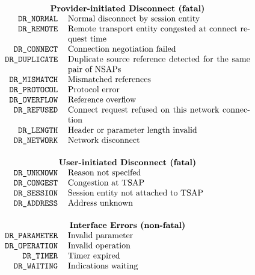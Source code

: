 
\normalsize
\[\begin{tabular}{rp{3.0in}}
	\multicolumn{2}{c}{\bf Provider-initiated Disconnect (fatal)}\\
\tt DR\_NORMAL&		Normal disconnect by session entity\\
\tt DR\_REMOTE&		Remote transport entity congested at connect request
			time\\
\tt DR\_CONNECT&	Connection negotiation failed\\
\tt DR\_DUPLICATE&	Duplicate source reference detected for the same pair
			of NSAPs\\
\tt DR\_MISMATCH&	Mismatched references\\
\tt DR\_PROTOCOL&	Protocol error\\
\tt DR\_OVERFLOW&	Reference overflow\\
\tt DR\_REFUSED&	Connect request refused on this network connection\\
\tt DR\_LENGTH&		Header or parameter length invalid\\
\tt DR\_NETWORK&	Network disconnect\\[0.2in]
		\multicolumn{2}{c}{\bf User-initiated Disconnect (fatal)}\\
\tt DR\_UNKNOWN&	Reason not specifed\\
\tt DR\_CONGEST&	Congestion at TSAP\\
\tt DR\_SESSION&	Session entity not attached to TSAP\\
\tt DR\_ADDRESS&	Address unknown\\[0.2in]
		\multicolumn{2}{c}{\bf Interface Errors (non-fatal)}\\
\tt DR\_PARAMETER&	Invalid parameter\\
\tt DR\_OPERATION&	Invalid operation\\
\tt DR\_TIMER&		Timer expired\\
\tt DR\_WAITING&	Indications waiting
\end{tabular}\]
